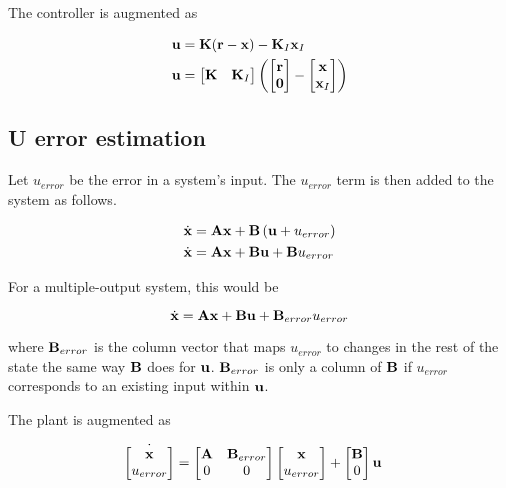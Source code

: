 The controller is augmented as

\begin{align*}
  \mathbf{u} &= \mathbf{K} (\mathbf{r} - \mathbf{x}) - \mathbf{K}_I\mathbf{x}_I \\
  \mathbf{u} &=
  \begin{bmatrix}
    \mathbf{K} & \mathbf{K}_I
  \end{bmatrix}
  \left(\begin{bmatrix}
    \mathbf{r} \\
    \mathbf{0}
  \end{bmatrix} -
  \begin{bmatrix}
    \mathbf{x} \\
    \mathbf{x}_I
  \end{bmatrix}\right)
\end{align*}

\subsection{U error estimation}

Let $u_{error}$ be the error in a system's input. The $u_{error}$ term is then
added to the system as follows.

\begin{align*}
  \dot{\mathbf{x}} &= \mathbf{A}\mathbf{x} + \mathbf{B}\left(\mathbf{u} + u_{error}\right) \\
  \dot{\mathbf{x}} &= \mathbf{A}\mathbf{x} + \mathbf{B}\mathbf{u} + \mathbf{B}u_{error}
\end{align*}

For a multiple-output system, this would be

\begin{equation*}
  \dot{\mathbf{x}} = \mathbf{A}\mathbf{x} + \mathbf{B}\mathbf{u} + \mathbf{B}_{error}u_{error}
\end{equation*}

where $\mathbf{B}_{error}$ is the column vector that maps $u_{error}$ to changes in
the rest of the state the same way $\mathbf{B}$ does for $\mathbf{u}$.
$\mathbf{B}_{error}$ is only a column of $\mathbf{B}$ if $u_{error}$ corresponds to an
existing input within $\mathbf{u}$.

The plant is augmented as

\begin{align*}
  \dot{\begin{bmatrix}
    \mathbf{x} \\
    u_{error}
  \end{bmatrix}} &=
  \begin{bmatrix}
    \mathbf{A} & \mathbf{B}_{error} \\
    0 & 0
  \end{bmatrix}
  \begin{bmatrix}
    \mathbf{x} \\
    u_{error}
  \end{bmatrix} +
  \begin{bmatrix}
    \mathbf{B} \\
    0
  \end{bmatrix}
  \mathbf{u}
\end{align*}

